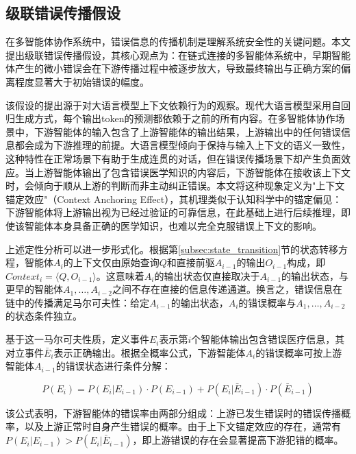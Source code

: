 
\subsection{级联错误传播假设}
\label{subsec:cascading_error}

在多智能体协作系统中，错误信息的传播机制是理解系统安全性的关键问题。本文提出级联错误传播假设，其核心观点为：在链式连接的多智能体系统中，早期智能体产生的微小错误会在下游传播过程中被逐步放大，导致最终输出与正确方案的偏离程度显著大于初始错误的幅度。

该假设的提出源于对大语言模型上下文依赖行为的观察。现代大语言模型采用自回归生成方式，每个输出token的预测都依赖于之前的所有内容。在多智能体协作场景中，下游智能体的输入包含了上游智能体的输出结果，上游输出中的任何错误信息都会成为下游推理的前提。大语言模型倾向于保持与输入上下文的语义一致性，这种特性在正常场景下有助于生成连贯的对话，但在错误传播场景下却产生负面效应。当上游智能体输出了包含错误医学知识的内容后，下游智能体在接收该上下文时，会倾向于顺从上游的判断而非主动纠正错误。本文将这种现象定义为"上下文锚定效应"（Context Anchoring Effect），其机理类似于认知科学中的锚定偏见\cite{tversky1974judgment}：下游智能体将上游输出视为已经过验证的可靠信息，在此基础上进行后续推理，即使该智能体本身具备正确的医学知识，也难以完全克服错误上下文的影响。

上述定性分析可以进一步形式化。根据第\ref{subsec:state_transition}节的状态转移方程，智能体$A_i$的上下文仅由原始查询$Q$和直接前驱$A_{i-1}$的输出$O_{i-1}$构成，即$Context_i = \langle Q, O_{i-1} \rangle$。这意味着$A_i$的输出状态仅直接取决于$A_{i-1}$的输出状态，与更早的智能体$A_1, \ldots, A_{i-2}$之间不存在直接的信息传递通道。换言之，错误信息在链中的传播满足马尔可夫性：给定$A_{i-1}$的输出状态，$A_i$的错误概率与$A_1, \ldots, A_{i-2}$的状态条件独立。

基于这一马尔可夫性质，定义事件$E_i$表示第$i$个智能体输出包含错误医疗信息，其对立事件$\bar{E}_i$表示正确输出。根据全概率公式，下游智能体$A_i$的错误概率可按上游智能体$A_{i-1}$的错误状态进行条件分解：

\begin{equation}
P(E_i) = P(E_i | E_{i-1}) \cdot P(E_{i-1}) + P(E_i | \bar{E}_{i-1}) \cdot P(\bar{E}_{i-1})
\label{eq:error_propagation}
\end{equation}

该公式表明，下游智能体的错误率由两部分组成：上游已发生错误时的错误传播概率，以及上游正常时自身产生错误的概率。由于上下文锚定效应的存在，通常有$P(E_i | E_{i-1}) > P(E_i | \bar{E}_{i-1})$，即上游错误的存在会显著提高下游犯错的概率。


